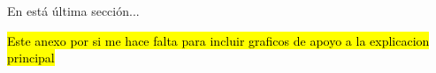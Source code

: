 


En está última sección...

 \hl{Este anexo por si me hace falta para incluir graficos de apoyo a la explicacion principal}